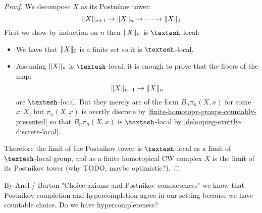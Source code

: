 \begin{proof}
We decompose $X$ as its Postnikov tower:
\[\lVert X \rVert_{n+1}\to \lVert X \rVert_n\to\cdots \to \lVert X \rVert_0\]
First we show by induction on $n$ then $\lVert X \rVert_n$ is $\shape$-local:
\begin{itemize}
\item We have that $\lVert X \rVert_0$ is a finite set so it is $\shape$-local.
\item Assuming $\lVert X \rVert_n$ is $\shape$-local, it is enough to prove that the fibers of the map:
\[\lVert X \rVert_{n+1}\to \lVert X \rVert_n\]
are $\shape$-local. But they merely are of the form $B_n\pi_n(X,x)$ for some $x:X$, but $\pi_n(X,x)$ is overtly discrete by \cref{finite-homotopy-groups-countably-presented} so that $B_n\pi_n(X,x)$ is $\shape$-local by \cref{delooping-overtly-discrete-local}.
\end{itemize}
Therefore the limit of the Postnikov tower is $\shape$-local as a limit of $\shape$-local group, and as a finite homotopical CW complex $X$ is the limit of its Postnikov tower (why TODO, maybe optimistic?).
\end{proof}

\begin{remark}
By Anel / Barton "Choice axioms and Postnikov completeness" we know that Postnikov completion and hypercompletion agree in our setting because we have countable choice. Do we have hypercompleteness?
\end{remark}

